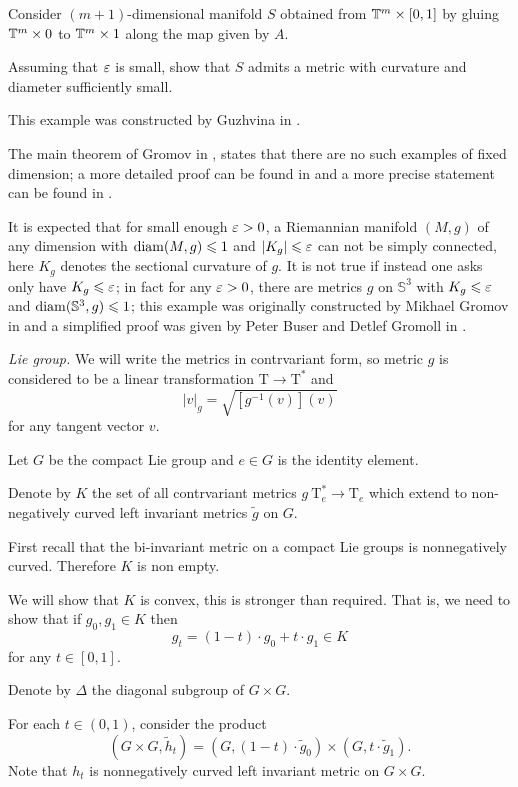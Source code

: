 Consider $(m+1)$-dimensional manifold $S$ obtained from $\mathbb{T}^m\times [0,1]$ by gluing $\mathbb{T}^m\times 0$ to $\mathbb{T}^m\times 1$ along the map given by $A$.

Assuming that $\varepsilon$ is small,
show that $S$ admits a metric with curvature and diameter sufficiently small.

This example was constructed by Guzhvina in \cite{guzhvina}.

The main theorem of Gromov in \cite{gromov-almost-flat}, 
states that there are no such examples of fixed dimension;
a more detailed proof can be found in \cite{buser-karcher}
and a more precise statement can be found in \cite{ruh}.

It is expected that for small enough $\varepsilon>0$,
a Riemannian manifold $(M,g)$ of any dimension 
with  $\operatorname{\rm diam}(M,g)\leqslant 1$ and $|K_g|\leqslant \varepsilon$ can not be simply connected,
here $K_g$ denotes the sectional curvature of $g$.
It is not true if instead one asks only have $K_g\leqslant \varepsilon$;
in fact for any $\varepsilon>0$,
there are metrics $g$ on $\mathbb{S}^3$ 
with $K_g\leqslant \varepsilon$ and $\operatorname{\rm diam}(\mathbb{S}^3,g)\leqslant 1$; 
this example was originally constructed by Mikhael Gromov in \cite{gromov-almost-flat} and a simplified proof was given by 
Peter Buser
and Detlef Gromoll in \cite{buser-gromoll}.


\textit{Lie group.} We will write the metrics in contrvariant form, 
so metric $g$ is considered to be a linear transformation $\mathrm T\to \mathrm T^*$ and 
\[|v|_g=\sqrt{[g^{-1}(v)](v)}\]
for any tangent vector $v$.


Let $G$ be the compact Lie group and $e\in G$ is the identity element.

Denote by $K$ the set of all contrvariant metrics $g\:\mathrm{T}^*_e\to \mathrm{T}_e $ 
which extend to non-negatively curved left invariant metrics $\tilde g$ on $G$. 

First recall that the bi-invariant metric on a compact Lie groups is nonnegatively curved. 
Therefore $K$ is non empty.

We will show that $K$ is convex, this is stronger than required.
That is, we need to show that if $g_0, g_1\in K$
then 
\[g_t=(1-t)\cdot g_0+t\cdot g_1\in K\] 
for any $t\in [0,1]$.

Denote by $\Delta$ the diagonal subgroup of $G\times G$.

For each $t\in (0,1)$, consider the product 
\[(G\times G,\tilde h_t)
=
(G,(1-t)\cdot \tilde g_0)\times (G,t\cdot \tilde g_1).\]
Note that $h_t$ is nonnegatively curved left invariant metric on $G\times G$.


